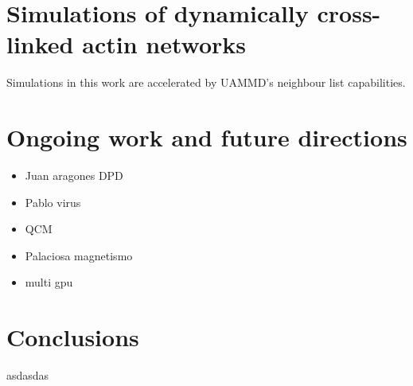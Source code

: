 \documentclass[ twoside,openright,titlepage,numbers=noenddot,%
headinclude,footinclude,cleardoublepage=empty,abstract=on,
BCOR=5mm,paper=a4,fontsize=11pt, dvipsnames
]{scrreprt}
\newcommand{\uammd}{\gls{UAMMD}\xspace}
\begin{document}
\chapter{Simulations of dynamically cross-linked actin networks}
Simulations in this work are accelerated by \uammd's neighbour list capabilities.

\chapter{Ongoing work and future directions}

\begin{itemize}
\item Juan aragones DPD
\item Pablo virus
\item QCM
\item Palaciosa magnetismo
\item multi gpu
\end{itemize}

\chapter{Conclusions}

asdasdas
\end{document}
